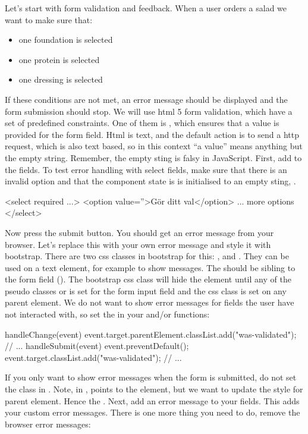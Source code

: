 \documentclass[fleqn, article, a4paper]{memoir}
\begin{document}
\begin{Assignments}

\item Let's start with form validation and feedback. When a user orders a salad we want to make sure that:
\begin{itemize}
  \item one foundation is selected
  \item one protein is selected
  \item one dressing is selected
\end{itemize}
If these conditions are not met, an error message should be displayed and the form submission should stop. We will use html 5 form validation, which have a set of predefined constraints. One of them is , which ensures that a value is provided for the form field. Html is text, and the default action is to send a http request, which is also text based, so in this context ``a value'' means anything but the empty string. Remember, the empty sting is falsy in JavaScript. First, add  to the  fields. To test error handling with select fields, make sure that there is an invalid option and that the component state is is initialised to an empty sting, .
\begin{Code}
<select required ...>
  <option value=''>Gör ditt val</option>
  ... more options
</select>
\end{Code}
Now press the submit button. You should get an error message from your browser. Let's replace this with your own error message and style it with bootstrap. There are two css classes in bootstrap for this: , and . They can be used on a text element, for example  to show messages. The  should be sibling to the form field (). The bootstrap css class will hide the element until any of the pseudo classes  or  is set for the form input field and the css class  is set on any parent element. We do not want to show error messages for fields the user have not interacted with, so set the  in your  and/or  functions:
\begin{Code}
handleChange(event) {
  event.target.parentElement.classList.add("was-validated");
  // ...
}
handleSubmit(event){
  event.preventDefault();
  event.target.classList.add("was-validated");
  // ...
}
\end{Code}
If you only want to show error messages when the form is submitted, do not set the class in . Note, in ,  points to the  element, but we want to update the style for parent  element. Hence the . Next, add an error message to your  fields. This adds your custom error messages. There is one more thing you need to do, remove the browser error messages:

\end{Assignments}
\end{document}

